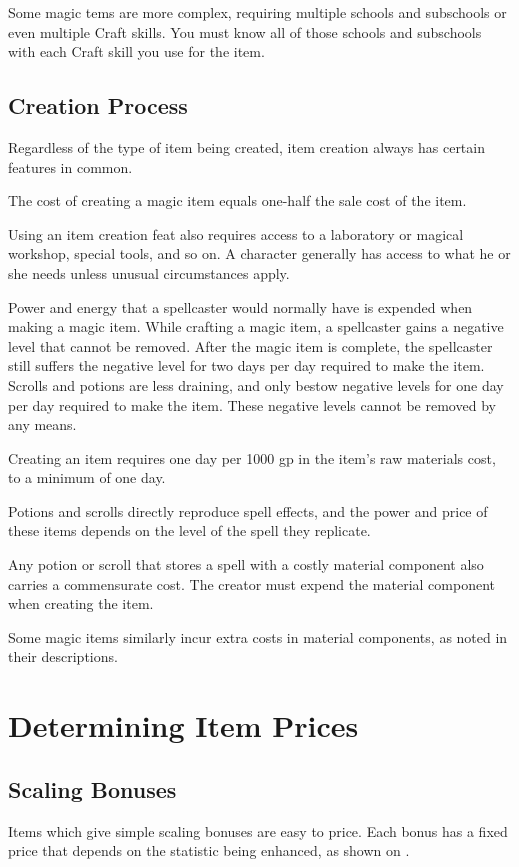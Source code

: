 Some magic tems are more complex, requiring multiple schools and subschools or even multiple Craft skills. You must know all of those schools and subschools with each Craft skill you use for the item.

\subsection{Creation Process}
Regardless of the type of item being created, item creation always has certain features in common.

 The cost of creating a magic item equals one-half the sale cost of the item.

Using an item creation feat also requires access to a laboratory or magical workshop, special tools, and so on. A character generally has access to what he or she needs unless unusual circumstances apply.

 Power and energy that a spellcaster would normally have is expended when making a magic item. While crafting a magic item, a spellcaster gains a negative level that cannot be removed. After the magic item is complete, the spellcaster still suffers the negative level for two days per day required to make the item. Scrolls and potions are less draining, and only bestow negative levels for one day per day required to make the item. These negative levels cannot be removed by any means.

 Creating an item requires one day per 1000 gp in the item's raw materials cost, to a minimum of one day.

 Potions and scrolls directly reproduce spell effects, and the power and price of these items depends on the level of the spell they replicate. 

 Any potion or scroll that stores a spell with a costly material component also carries a commensurate cost. The creator must expend the material component when creating the item.

\par Some magic items similarly incur extra costs in material components, as noted in their descriptions.

\section{Determining Item Prices}

\subsection{Scaling Bonuses}
Items which give simple scaling bonuses are easy to price. Each bonus has a fixed price that depends on the statistic being enhanced, as shown on .

